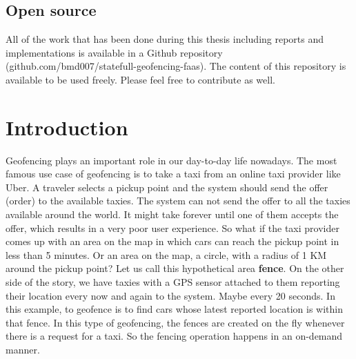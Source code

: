 \documentclass[a4]{report}
\begin{document}
    \section*{Open source}
    All of the work that has been done during this thesis including reports and implementations is available in a Github repository (github.com/bmd007/statefull-geofencing-faas).
    The content of this repository is available to be used freely.
    Please feel free to contribute as well.

    \newpage

    \tableofcontents

    \listoffigures

    \listoftables

    \newpage


    \chapter{Introduction}
    Geofencing\cite{geofencing} plays an important role in our day-to-day life nowadays.
    The most famous use case of geofencing is to take a taxi\cite{taxi-geofencing} from an online taxi provider like Uber.
    A traveler selects a pickup point and the system should send the offer (order) to the available taxies.
    The system can not send the offer to all the taxies available around the world.
    It might take forever until one of them accepts the offer, which results in a very poor user experience.
    So what if the taxi provider comes up with an area on the map in which cars can reach the pickup point in less than 5 minutes.
    Or an area on the map, a circle, with a radius of 1 KM around the pickup point?
    Let us call this hypothetical area \textbf{fence}.
    On the other side of the story, we have taxies with a GPS sensor attached to them reporting their location every now and again to the system.
    Maybe every 20 seconds.
    In this example, to geofence is to find cars whose latest reported location is within that fence.
    In this type of geofencing, the fences are created on the fly whenever there is a request for a taxi.
    So the fencing operation happens in an on-demand manner.
\end{document}
